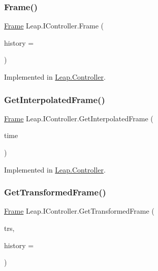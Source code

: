 \subsubsection{\texorpdfstring{Frame()}{Frame()}}
{\footnotesize\ttfamily \mbox{\hyperlink{class_leap_1_1_frame}{Frame}} Leap.\+I\+Controller.\+Frame (\begin{DoxyParamCaption}\item[{int}]{history = {} }\end{DoxyParamCaption})}



Implemented in \mbox{\hyperlink{class_leap_1_1_controller_ac41dc9c50a3bd2a892cc44af0859ef0d}{Leap.\+Controller}}.

\mbox{\label{interface_leap_1_1_i_controller_a47758a602643bb7d6db92e024b334009}} 
\subsubsection{\texorpdfstring{GetInterpolatedFrame()}{GetInterpolatedFrame()}}
{\footnotesize\ttfamily \mbox{\hyperlink{class_leap_1_1_frame}{Frame}} Leap.\+I\+Controller.\+Get\+Interpolated\+Frame (\begin{DoxyParamCaption}\item[{Int64}]{time }\end{DoxyParamCaption})}



Implemented in \mbox{\hyperlink{class_leap_1_1_controller_aa99cf433f25105c63083d9b6f6ded2e9}{Leap.\+Controller}}.

\mbox{\label{interface_leap_1_1_i_controller_a10970bf31bdf9dfd46f0449a1759151d}} 
\subsubsection{\texorpdfstring{GetTransformedFrame()}{GetTransformedFrame()}}
{\footnotesize\ttfamily \mbox{\hyperlink{class_leap_1_1_frame}{Frame}} Leap.\+I\+Controller.\+Get\+Transformed\+Frame (\begin{DoxyParamCaption}\item[{\mbox{\hyperlink{struct_leap_1_1_leap_transform}{Leap\+Transform}}}]{trs,  }\item[{int}]{history = {} }\end{DoxyParamCaption})}



